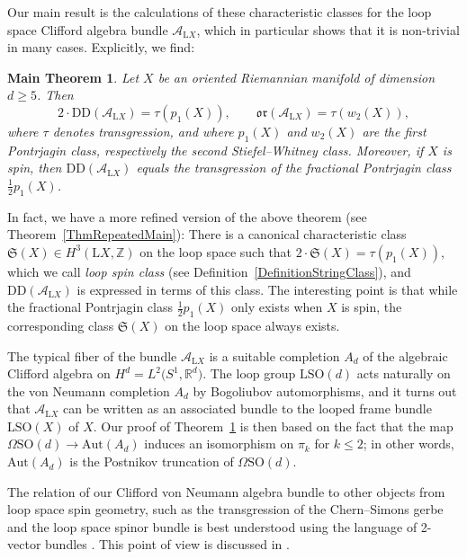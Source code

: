 \documentclass[11pt]{article}
\numberwithin{equation}{section}
\numberwithin{equation}{section}
\newtheorem{Maintheorem}[Theorem]{Main Theorem}
 { \theoremstyle{definition}
\newtheorem{Definition}[Theorem]{Definition}
\newtheorem{Note}[Theorem]{Note}
\newtheorem{Example}[Theorem]{Example}
\newtheorem{Remark}[Theorem]{Remark} }
\newcommand{\R}{\mathbb{R}}
\newcommand{\Z}{\mathbb{Z}}
\newcommand{\SO}{\mathrm{SO}}
\newcommand{\Aut}{\mathrm{Aut}}
\renewcommand{\L}{\mathrm{L}}
\newcommand{\DD}{\mathrm{DD}}
\newcommand{\oclass}{\mathfrak{or}}
\begin{document}
Our main result is the calculations of these characteristic classes for the loop space Clifford algebra bundle $\mathcal{A}_{\L X}$, which in particular shows that it is non-trivial in many cases.
Explicitly, we find:

\begin{Maintheorem} \label{ThmObstructionClass}
Let $X$ be an oriented Riemannian manifold of dimension $d\geq 5$.
Then
\begin{equation*}
2\cdot \mathrm{DD}(\mathcal{A}_{\L X}) = \tau(p_1(X)),\qquad \oclass(\mathcal{A}_{\L X}) = \tau(w_2(X)),
\end{equation*}
where $\tau$ denotes transgression, and where $p_1(X)$ and $w_2(X)$ are the first Pontrjagin class, respectively the second Stiefel--Whitney class.
Moreover, if $X$ is spin, then $\mathrm{DD}(\mathcal{A}_{\L X})$ equals the transgression of the fractional Pontrjagin class $\frac{1}{2}p_1(X)$.
\end{Maintheorem}

In fact, we have a more refined version of the above theorem (see Theorem~\ref{ThmRepeatedMain}):
There is a canonical characteristic class $\mathfrak{S}(X) \in H^3(\L X, \Z)$ on the loop space such that $2 \cdot \mathfrak{S}(X) = \tau(p_1(X))$, which we call \emph{loop spin class} (see Definition~\ref{DefinitionStringClass}),
and $\DD(\mathcal{A}_{\L X})$ is expressed in terms of this class.
The interesting point is that while the fractional Pontrjagin class $\frac{1}{2}p_1(X)$ only exists when $X$ is spin, the corresponding class $\mathfrak{S}(X)$ on the loop space always exists.

The typical fiber of the bundle $\mathcal{A}_{\L X}$ is a suitable completion $A_d$ of the algebraic Clifford algebra on $H^d = L^2\big(S^1, \R^d\big)$.
The loop group $\L\SO(d)$ acts naturally on the von Neumann completion $A_d$ by Bogoliubov automorphisms, and it turns out that $\mathcal{A}_{\L X}$ can be written as an associated bundle to the looped frame bundle $\L\SO(X)$ of $X$.
Our proof of Theorem~\ref{ThmObstructionClass} is then based on the fact that the map $\Omega\SO(d) \to \Aut(A_d)$ induces an isomorphism on $\pi_k$ for $k \leq 2$; in other words, $\Aut(A_d)$ is the Postnikov truncation of $\Omega\SO(d)$.



The relation of our Clifford von Neumann algebra bundle to other objects from loop space spin geometry, such as the transgression of the Chern--Simons gerbe \cite{WaldorfSpinString} and the loop space spinor bundle \cite{ KristelWaldorf2, KristelWaldorf3,KristelWaldorf1} is best understood using the language of 2-vector bundles \cite{2vectorbundles}.
This point of view is discussed in \cite[Section~1]{LudewigSpinorBundle}.
\end{document}
